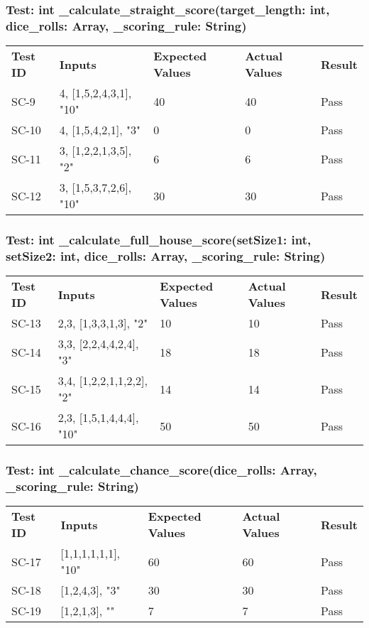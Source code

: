 \documentclass[12pt, titlepage]{article}
\begin{document}
\subsubsection{Test: int \_calculate\_straight\_score(target\_length: int, dice\_rolls: Array, \_scoring\_rule: String)}
\begin{tabularx}{\textwidth}{|p{2cm}|p{3.5cm}|p{4cm}|p{4cm}|p{1.5cm}|}
    \cline{1-5}
    \textbf{Test ID} & \textbf{Inputs} & \textbf{Expected Values} & \textbf{Actual Values} & \textbf{Result} \\
    \cline{1-5}
    SC-9 & 4, [1,5,2,4,3,1], "10" & 40 & 40 & Pass \\
    \cline{1-5}
    SC-10 & 4, [1,5,4,2,1], "3" & 0 & 0 & Pass \\
    \cline{1-5}
    SC-11 & 3, [1,2,2,1,3,5], "2" & 6 & 6 & Pass \\
    \cline{1-5}
    SC-12 & 3, [1,5,3,7,2,6], "10" & 30 & 30 & Pass \\
    \cline{1-5}
\end{tabularx}

\subsubsection{Test: int \_calculate\_full\_house\_score(setSize1: int, setSize2: int, dice\_rolls: Array, \_scoring\_rule: String)}
\begin{tabularx}{\textwidth}{|p{2cm}|p{3.5cm}|p{4cm}|p{4cm}|p{1.5cm}|}
    \cline{1-5}
    \textbf{Test ID} & \textbf{Inputs} & \textbf{Expected Values} & \textbf{Actual Values} & \textbf{Result} \\
    \cline{1-5}
    SC-13 & 2,3, [1,3,3,1,3], "2" & 10 & 10 & Pass \\
    \cline{1-5}
    SC-14 & 3,3, [2,2,4,4,2,4], "3" & 18 & 18 & Pass \\
    \cline{1-5}
    SC-15 & 3,4, [1,2,2,1,1,2,2], "2" & 14 & 14 & Pass \\
    \cline{1-5}
    SC-16 & 2,3, [1,5,1,4,4,4], "10" & 50 & 50 & Pass \\
    \cline{1-5}
\end{tabularx}

\subsubsection{Test: int \_calculate\_chance\_score(dice\_rolls: Array, \_scoring\_rule: String)}
\begin{tabularx}{\textwidth}{|p{2cm}|p{3.5cm}|p{4cm}|p{4cm}|p{1.5cm}|}
    \cline{1-5}
    \textbf{Test ID} & \textbf{Inputs} & \textbf{Expected Values} & \textbf{Actual Values} & \textbf{Result} \\
    \cline{1-5}
    SC-17 & [1,1,1,1,1,1], "10" & 60 & 60 & Pass \\
    \cline{1-5}
    SC-18 & [1,2,4,3], "3" & 30 & 30 & Pass \\
    \cline{1-5}
    SC-19 & [1,2,1,3], "" & 7 & 7 & Pass \\
    \cline{1-5}
\end{tabularx}
\end{document}
